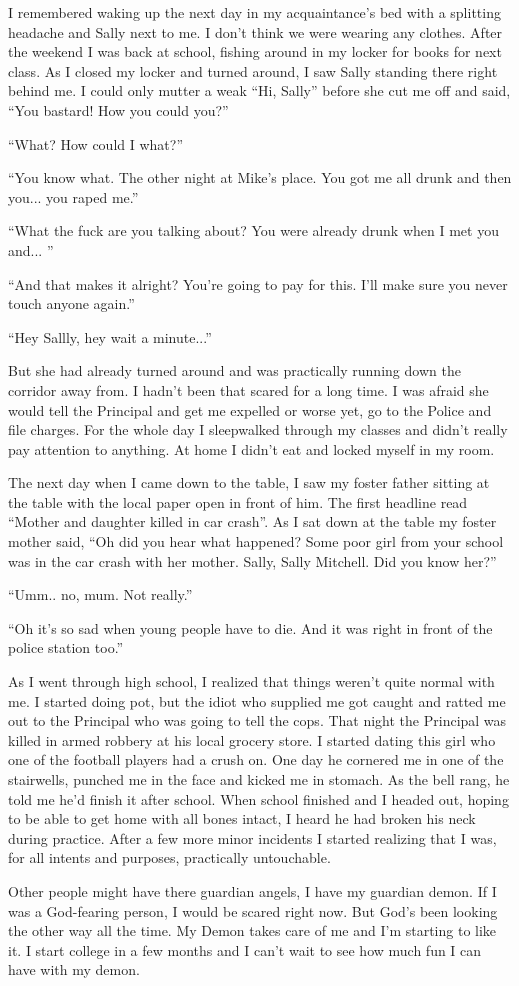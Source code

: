 \documentclass[11pt,letterpaper]{article}
\begin{document}
I remembered waking up the next day in my acquaintance's bed with a splitting headache and Sally next to me. I don't think we were wearing any clothes. After the weekend I was back at school, fishing around in my locker for books for next class. As I closed my locker and turned around, I saw Sally standing there right behind me. I could only mutter a weak ``Hi, Sally'' before she cut me off and said, ``You bastard! How you could you?''

``What? How could I what?''

``You know what. The other night at Mike's place. You got me all drunk and then you... you raped me.''

``What the fuck are you talking about? You were already drunk when I met you and... ''

``And that makes it alright? You're going to pay for this. I'll make sure you never touch anyone again.''

``Hey Sallly, hey wait a minute...''

But she had already turned around and was practically running down the corridor away from. I hadn't been that scared for a long time. I was afraid she would tell the Principal and get me expelled or worse yet, go to the Police and file charges. For the whole day I sleepwalked through my classes and didn't really pay attention to anything. At home I didn't eat and locked myself in my room.

The next day when I came down to the table, I saw my foster father sitting at the table with the local paper open in front of him. The first headline read ``Mother and daughter killed in car crash''. As I sat down at the table my foster mother said, ``Oh did you hear what happened? Some poor girl from your school was in the car crash with her mother. Sally, Sally Mitchell. Did you know her?''

``Umm.. no, mum. Not really.''

``Oh it's so sad when young people have to die. And it was right in front of the police station too.''

As I went through high school, I realized that things weren't quite normal with me. I started doing pot, but the idiot who supplied me got caught and ratted me out to the Principal who was going to tell the cops. That night the Principal was killed in armed robbery at his local grocery store. I started dating this girl who one of the football players had a crush on. One day he cornered me in one of the stairwells, punched me in the face and kicked me in stomach. As the bell rang, he told me he'd finish it after school. When school finished and I headed out, hoping to be able to get home with all bones intact, I heard he had broken his neck during practice. After a few more minor incidents I started realizing that I was, for all intents and purposes, practically untouchable.

Other people might have there guardian angels, I have my guardian demon. If I was a God-fearing person, I would be scared right now. But God's been looking the other way all the time. My Demon takes care of me and I'm starting to like it. I start college in a few months and I can't wait to see how much fun I can have with my demon.
\end{document}
